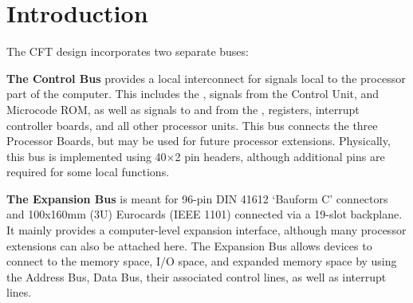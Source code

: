 








  
\section{Introduction}

The CFT design incorporates two separate buses:

\begin{description}

\item{\bfseries The Control Bus} provides a local interconnect for signals
  local to the processor part of the computer. This includes the \IBUS, signals
  from the Control Unit, and Microcode ROM, as well as signals to and from the
  \ALU, registers, interrupt controller boards, and all other processor
  units. This bus connects the three Processor Boards, but may be used for
  future processor extensions. Physically, this bus is implemented using 40×2
  pin headers, although additional pins are required for some local functions.

\item{\bfseries The Expansion Bus} is meant for 96-pin DIN 41612 ‘Bauform C’
  connectors and 100x160mm (3U) Eurocards (IEEE 1101) connected via a 19-slot
  backplane. It mainly provides a computer-level expansion interface, although
  many processor extensions can also be attached here. The Expansion Bus allows
  devices to connect to the memory space, I/O space, and expanded memory space
  by using the Address Bus, Data Bus, their associated control lines, as well
  as interrupt lines.

\end{description}

